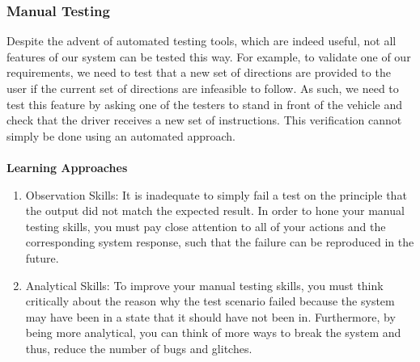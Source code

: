 \documentclass[12pt, titlepage]{article}
\begin{document}
\subsubsection{Manual Testing}
Despite the advent of automated testing tools, which are indeed useful, not all
features of our system can be tested this way. For example, to validate one of
our requirements, we need to test that a new set of directions are provided to
the user if the current set of directions are infeasible to follow. As such, we
need to test this feature by asking one of the testers to stand in front of the
vehicle and check that the driver receives a new set of instructions. This
verification cannot simply be done using an automated approach. \\
\\
\noindent \textbf{Learning Approaches}
\begin{enumerate}
    \item Observation Skills: It is inadequate to simply fail a test on the
    principle that the output did not match the expected result. In order to
    hone your manual testing skills, you must pay close attention to all of your
    actions and the corresponding system response, such that the failure can be
    reproduced in the future.
    \item Analytical Skills: To improve your manual testing skills, you must
    think critically about the reason why the test scenario failed because the
    system may have been in a state that it should have not been in.
    Furthermore, by being more analytical, you can think of more ways to break
    the system and thus, reduce the number of bugs and glitches.
\end{enumerate}
\end{document}
